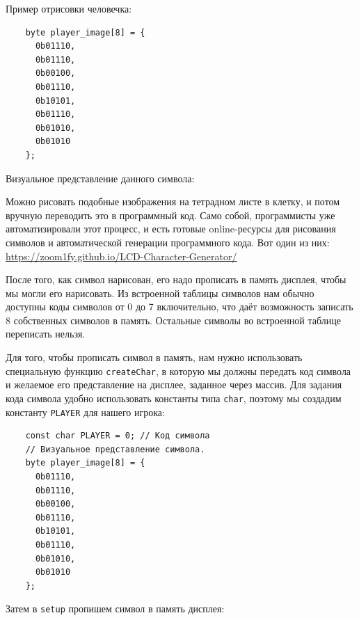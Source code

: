 \documentclass[../sparc.tex]{subfiles}
\begin{document}
Пример отрисовки человечка:

\begin{listing}[H]
  \begin{verbatim}
    byte player_image[8] = {
      0b01110,
      0b01110,
      0b00100,
      0b01110,
      0b10101,
      0b01110,
      0b01010,
      0b01010
    };
  \end{verbatim}
  \caption{Символ для текстового ЖК-дисплея, заданный через одномерный массив
    байт.}
  \label{listing:game-dev-lcd-custom-char}
\end{listing}

Визуальное представление данного символа:


Можно рисовать подобные изображения на тетрадном листе в клетку, и потом вручную
переводить это в программный код.  Само собой, программисты уже автоматизировали
этот процесс, и есть готовые online-ресурсы для рисования символов и
автоматической генерации программного кода.  Вот один из них:
\url{https://zoom1fy.github.io/LCD-Character-Generator/}

После того, как символ нарисован, его надо прописать в память дисплея, чтобы мы
могли его нарисовать.  Из встроенной таблицы символов нам обычно доступны коды
символов от 0 до 7 включительно, что даёт возможность записать 8 собственных
символов в память.  Остальные символы во встроенной таблице переписать нельзя.

Для того, чтобы прописать символ в память, нам нужно использовать специальную
функцию \texttt{createChar}, в которую мы должны передать код символа и желаемое
его представление на дисплее, заданное через массив.  Для задания кода символа
удобно использовать константы типа \texttt{char}, поэтому мы создадим константу
\texttt{PLAYER} для нашего игрока:

\begin{listing}[H]
  \begin{verbatim}
    const char PLAYER = 0; // Код символа
    // Визуальное представление символа.
    byte player_image[8] = {
      0b01110,
      0b01110,
      0b00100,
      0b01110,
      0b10101,
      0b01110,
      0b01010,
      0b01010
    };
  \end{verbatim}
  \caption{Задание константы для хранения кода собственного символа.}
  \label{listing:game-dev-lcd-custom-char-const}
\end{listing}

Затем в \texttt{setup} пропишем символ в память дисплея:
\end{document}
